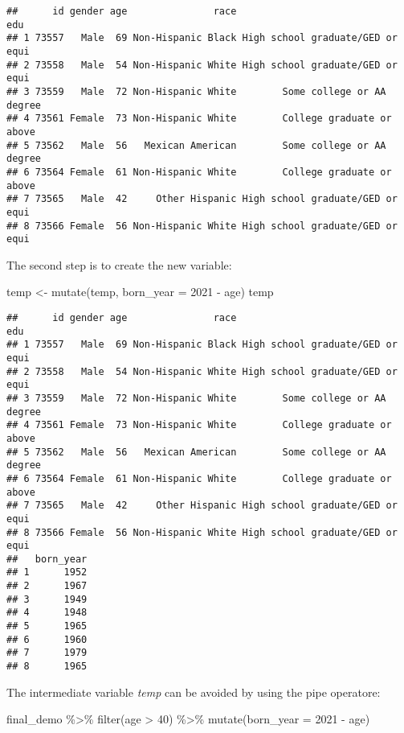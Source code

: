 \documentclass[
]{book}
\newenvironment{Shaded}{\begin{snugshade}}{\end{snugshade}}
\newcommand{\AttributeTok}[1]{\textcolor[rgb]{0.77,0.63,0.00}{#1}}
\newcommand{\DecValTok}[1]{\textcolor[rgb]{0.00,0.00,0.81}{#1}}
\newcommand{\FunctionTok}[1]{\textcolor[rgb]{0.00,0.00,0.00}{#1}}
\newcommand{\NormalTok}[1]{#1}
\newcommand{\OtherTok}[1]{\textcolor[rgb]{0.56,0.35,0.01}{#1}}
\newcommand{\SpecialCharTok}[1]{\textcolor[rgb]{0.00,0.00,0.00}{#1}}
\begin{document}
\begin{verbatim}
##      id gender age               race                              edu
## 1 73557   Male  69 Non-Hispanic Black High school graduate/GED or equi
## 2 73558   Male  54 Non-Hispanic White High school graduate/GED or equi
## 3 73559   Male  72 Non-Hispanic White        Some college or AA degree
## 4 73561 Female  73 Non-Hispanic White        College graduate or above
## 5 73562   Male  56   Mexican American        Some college or AA degree
## 6 73564 Female  61 Non-Hispanic White        College graduate or above
## 7 73565   Male  42     Other Hispanic High school graduate/GED or equi
## 8 73566 Female  56 Non-Hispanic White High school graduate/GED or equi
\end{verbatim}

The second step is to create the new variable:

\begin{Shaded}
\begin{Highlighting}[]
\NormalTok{temp }\OtherTok{\textless{}{-}} \FunctionTok{mutate}\NormalTok{(temp, }\AttributeTok{born\_year =} \DecValTok{2021} \SpecialCharTok{{-}}\NormalTok{ age)}
\NormalTok{temp}
\end{Highlighting}
\end{Shaded}

\begin{verbatim}
##      id gender age               race                              edu
## 1 73557   Male  69 Non-Hispanic Black High school graduate/GED or equi
## 2 73558   Male  54 Non-Hispanic White High school graduate/GED or equi
## 3 73559   Male  72 Non-Hispanic White        Some college or AA degree
## 4 73561 Female  73 Non-Hispanic White        College graduate or above
## 5 73562   Male  56   Mexican American        Some college or AA degree
## 6 73564 Female  61 Non-Hispanic White        College graduate or above
## 7 73565   Male  42     Other Hispanic High school graduate/GED or equi
## 8 73566 Female  56 Non-Hispanic White High school graduate/GED or equi
##   born_year
## 1      1952
## 2      1967
## 3      1949
## 4      1948
## 5      1965
## 6      1960
## 7      1979
## 8      1965
\end{verbatim}

The intermediate variable \emph{temp} can be avoided by using the pipe operatore:

\begin{Shaded}
\begin{Highlighting}[]
\NormalTok{final\_demo }\SpecialCharTok{\%\textgreater{}\%}
  \FunctionTok{filter}\NormalTok{(age }\SpecialCharTok{\textgreater{}} \DecValTok{40}\NormalTok{) }\SpecialCharTok{\%\textgreater{}\%}
  \FunctionTok{mutate}\NormalTok{(}\AttributeTok{born\_year =} \DecValTok{2021} \SpecialCharTok{{-}}\NormalTok{ age)}
\end{Highlighting}
\end{Shaded}
\end{document}
